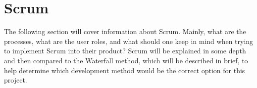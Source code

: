 \section{Scrum}


The following section will cover information about Scrum. Mainly, what are the processes, what are the user roles, and what should one keep in mind when trying to implement Scrum into their product? Scrum will be explained in some depth and then compared to the Waterfall method, which will be described in brief, to help determine which development method would be the correct option for this project.





